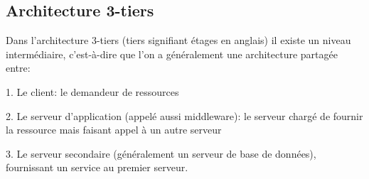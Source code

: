 \documentclass[../rapportdestage.tex]{subfiles}
\begin{document}
	\subsection{Architecture 3-tiers}
	Dans l'architecture 3-tiers (tiers signifiant étages en
anglais) il existe un niveau intermédiaire, c'est-à-dire que l'on a généralement une architecture partagée entre:

1. Le client: le demandeur de ressources

2. Le serveur d'application (appelé aussi middleware): le serveur chargé de fournir la ressource mais faisant appel à un autre serveur

3. Le serveur secondaire (généralement un serveur de base de données), fournissant un
service au premier serveur.
	
	
\end{document}
